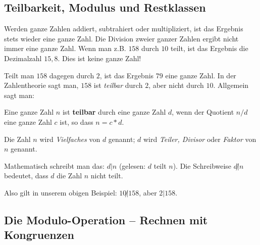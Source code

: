 \begin{refsegment}
\section[Teilbarkeit, Modulus und Restklassen]
        {Teilbarkeit, Modulus und Restklassen\footnotemark}
{} 
Werden ganze Zahlen addiert, subtrahiert oder multipliziert, ist das
Ergebnis stets wieder eine ganze Zahl.
Die Division zweier ganzer Zahlen ergibt nicht immer eine ganze Zahl. Wenn
man z.B. $158$ durch $10$ teilt, ist das Ergebnis die Dezimalzahl $15,8$.
Dies ist keine ganze Zahl!

Teilt man $158$ dagegen durch $2$, ist das Ergebnis $79$ eine ganze Zahl.
In der Zahlentheorie sagt man, $158$ ist {\em teilbar} durch $2$, aber nicht durch $10$.
Allgemein sagt man:

\begin{definition}\label{def-zth-divisibility} 
Eine ganze Zahl $n$ ist {\bf teilbar} durch eine ganze Zahl $d$, wenn der
Quotient $n/d$ eine ganze Zahl $c$ ist, so dass $n = c * d$.
\end{definition}

Die Zahl $n$ wird {\em Vielfaches} von $d$ genannt; $d$ wird {\em Teiler,
Divisor}   oder  {\em Faktor} von
$n$ genannt.

Mathematisch schreibt man das: $d | n$ (gelesen: \glqq  $d$ teilt $n$\grqq).
Die Schreibweise $d \!\!\not| n$ bedeutet, dass $d$ die Zahl $n$ nicht teilt.

Also gilt in unserem obigen Beispiel: $10\!\!\not| 158$, aber $2 | 158$.


\subsection{Die Modulo-Operation -- Rechnen mit Kongruenzen} 


\end{refsegment}
